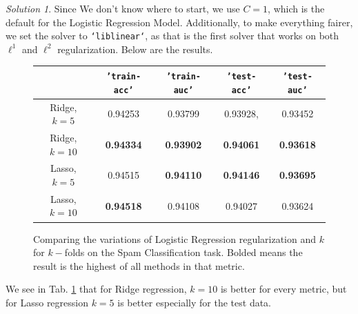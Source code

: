 \documentclass[a4paper,12pt]{article}
\theoremstyle{definition}
\theoremstyle{remark}
\newtheorem*{solution}{Solution}
\begin{document}
\begin{enumerate}
\begin{enumerate}
\begin{solution}
				Since We don't know where to start, we use $C=1$, which is the default for the Logistic Regression Model. Additionally, to make everything fairer, we set the solver to \texttt{`liblinear`}, as that is the first solver that works on both $\ell^1$ and $\ell^2$ regularization. Below are the results.
				\begin{figure}[h]
				\centering
				\begin{tabular}{|c|cccc|}
					\hline
					&  \texttt{'train-acc'}&\texttt{'train-auc'}  & \texttt{'test-acc'} &  \texttt{'test-auc'}\\
					\hline\hline
					Ridge, $k=5$& 0.94253& 0.93799 &0.93928, & 0.93452\\
					Ridge, $k=10$& {\bf0.94334}& {\bf0.93902}& {\bf0.94061}& {\bf0.93618}\\ \hline
					Lasso, $k=5$&0.94515& {\bf0.94110}& {\bf0.94146}& {\bf0.93695}\\ 
					Lasso, $k=10$&  {\bf0.94518}& 0.94108 & 0.94027& 0.93624\\ 
					\hline
				\end{tabular}
				\caption{Comparing the variations of Logistic Regression regularization and $k$ for $k-$folds  on the Spam Classification task. Bolded means the result is the highest of all methods in that metric.}
				\label{tab:kfoldresults1}
			\end{figure}
			We see in Tab. \ref{tab:kfoldresults1} that for Ridge regression, $k=10$ is better for every metric, but for Lasso regression $k=5$ is better especially for the test data.
			

\end{solution}
\end{enumerate}
\end{enumerate}
\end{document}
